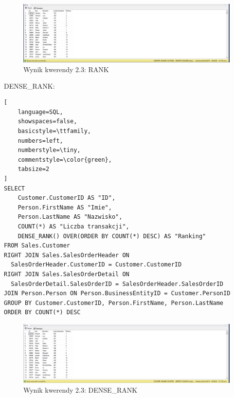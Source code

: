 \documentclass[a4paper,12pt]{article}
\begin{document}
\begin{figure}[H]
  \centering
  \includegraphics[width=1.0\textwidth]{images/2.3.png}
  \caption{Wynik kwerendy 2.3: RANK}
\end{figure}

DENSE\_RANK:

{\small
\begin{lstlisting}[
	language=SQL,
	showspaces=false,
	basicstyle=\ttfamily,
	numbers=left,
	numberstyle=\tiny,
	commentstyle=\color{green},
	tabsize=2
]
SELECT 
	Customer.CustomerID AS "ID",
	Person.FirstName AS "Imie",
	Person.LastName AS "Nazwisko",
	COUNT(*) AS "Liczba transakcji",
	DENSE_RANK() OVER(ORDER BY COUNT(*) DESC) AS "Ranking"
FROM Sales.Customer
RIGHT JOIN Sales.SalesOrderHeader ON 
  SalesOrderHeader.CustomerID = Customer.CustomerID
RIGHT JOIN Sales.SalesOrderDetail ON 
  SalesOrderDetail.SalesOrderID = SalesOrderHeader.SalesOrderID
JOIN Person.Person ON Person.BusinessEntityID = Customer.PersonID
GROUP BY Customer.CustomerID, Person.FirstName, Person.LastName
ORDER BY COUNT(*) DESC
\end{lstlisting}}

\begin{figure}[H]
  \centering
  \includegraphics[width=1.0\textwidth]{images/2.3_dense.png}
  \caption{Wynik kwerendy 2.3: DENSE\_RANK}
\end{figure}

\subsection{}
\end{document}
